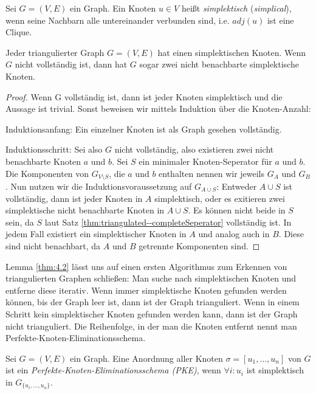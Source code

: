 \documentclass[../main.tex]{subfiles}
\begin{document}
\begin{definition}
    Sei $G = (V, E)$ ein Graph. Ein Knoten $u \in V$ heißt \emph{simplektisch} (\emph{simplical}), wenn seine Nachbarn alle untereinander verbunden sind, i.e. $adj(u)$ ist eine Clique.
\end{definition}

\begin{lemma}\label{thm:4.2}
    Jeder triangulierter Graph $G = (V, E)$ hat einen simplektischen Knoten. Wenn $G$ nicht vollständig ist, dann hat $G$ sogar zwei nicht benachbarte simplektische Knoten.
\end{lemma}
\begin{proof}
    Wenn G vollständig ist, dann ist jeder Knoten simplektisch und die Aussage ist trivial. Sonst beweisen wir mittels Induktion über die Knoten-Anzahl:
    
    Induktionsanfang: Ein einzelner Knoten ist als Graph gesehen vollständig.
    
    Induktionsschritt: Sei also $G$ nicht vollständig, also existieren zwei nicht benachbarte Knoten $a$ und $b$. Sei $S$ ein minimaler Knoten-Seperator für $a$ und $b$. Die Komponenten von $G_{V \setminus S}$, die $a$ und $b$ enthalten nennen wir jeweils $G_A$ und $G_B$. Nun nutzen wir die Induktionsvoraussetzung auf $G_{A \cup S}$: Entweder $A \cup S$ ist vollständig, dann ist jeder Knoten in $A$ simplektisch, oder es exitieren zwei simplektische nicht benachbarte Knoten in $A \cup S$. Es können nicht beide in $S$ sein, da $S$ laut Satz \ref{thm:triangulated--completeSeperator} vollständig ist. In jedem Fall existiert ein simplektischer Knoten in $A$ und analog auch in $B$. Diese sind nicht benachbart, da $A$ und $B$ getrennte Komponenten sind.
\end{proof}
    
Lemma \ref{thm:4.2} lässt uns auf einen ersten Algorithmus zum Erkennen von triangulierten Graphen schließen: Man suche nach simplektischen Knoten und entferne diese iterativ. Wenn immer simplektische Knoten gefunden werden können, bis der Graph leer ist, dann ist der Graph trianguliert. Wenn in einem Schritt kein simplektischer Knoten gefunden werden kann, dann ist der Graph nicht trianguliert. Die Reihenfolge, in der man die Knoten entfernt nennt man Perfekte-Knoten-Eliminationsschema.

\begin{definition}
    Sei $G = (V, E)$ ein Graph. Eine Anordnung aller Knoten $\sigma = [u_1, \hdots, u_n]$ von $G$ ist ein \emph{Perfekte-Knoten-Eliminationsschema (PKE)}, wenn $\forall i : u_i$ ist simplektisch in $G_{\{u_i, \hdots, u_n\}}$.
\end{definition}
\end{document}

